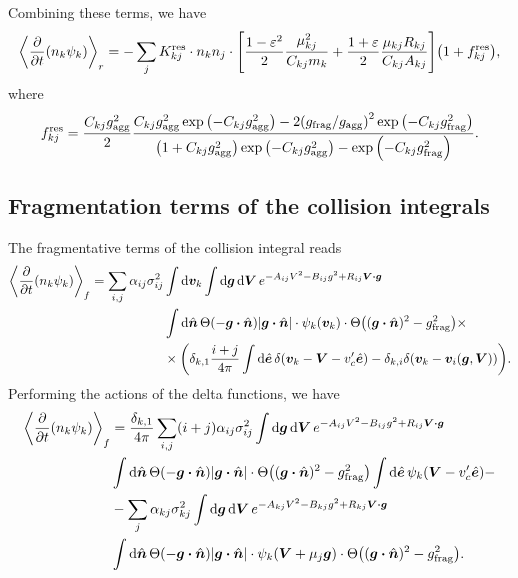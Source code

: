 \documentclass[aps,prl,preprint,groupedaddress,10pt]{revtex4-2}
\begin{document}
Combining these terms, we have
\begin{equation}
    \begin{split}
        \avg{\pdv{t}(n_k\psi_k)}_r=-\sum_{j}\utx{K}{res}_{kj}\cdot n_kn_j\cdot
        \bqty{\frac{1-\eps^2}{2}\frac{\mu_{kj}^2}{C_{kj}m_k}+\frac{1+\eps}{2}
        \frac{\mu_{kj}R_{kj}}{C_{kj}A_{kj}}}\pqty{1+\utx{f}{res}_{kj}},
    \end{split}
\end{equation}
where
\begin{equation}
    \utx{f}{res}_{kj}=\frac{C_{kj}\ltx{g}{agg}^2}{2}\frac{C_{kj}\ltx{g}{agg}^2
    \exp\pqty{-C_{kj}\ltx{g}{agg}^2}-2\pqty{\ltx{g}{frag}/\ltx{g}{agg}}^2
    \exp\pqty{-C_{kj}\ltx{g}{frag}^2}}{\pqty{1+C_{kj}\ltx{g}{agg}^2}
    \exp\pqty{-C_{kj}\ltx{g}{agg}^2}-\exp\pqty{-C_{kj}\ltx{g}{frag}^2}}.
\end{equation}
\subsection{Fragmentation terms of the collision integrals}
The fragmentative terms of the collision integral reads
\begin{equation}
    \begin{split}
        \avg{\pdv{t}(n_k\psi_k)}_f=\sum_{i,j}\alpha_{ij}\sigma_{ij}^2&\int\dd{\bv_k}\int
        \dd{\bg}\dd{\bV}e^{-A_{ij}V^2-B_{ij}g^2+R_{ij}\bV\vdot\bg}\\
        &\int\dd{\bn}\Theta\pqty{-\bg\vdot\bn}\abs{\bg\vdot\bn}\cdot\psi_k(\bv_k)\cdot
        \Theta\pqty{(\bg\vdot\bn)^2-\ltx{g}{frag}^2}\times\\
        &\times\pqty{\delta_{k,1}\frac{i+j}{4\pi}\int\dd{\be}\delta\pqty{\bv_k-\bV-v'_c\be}
            -\delta_{k,i}\delta\pqty{\bv_k-\bv_i(\bg,\bV)}}.
    \end{split}
\end{equation}
Performing the actions of the delta functions, we have
\begin{equation}
    \begin{split}
        \avg{\pdv{t}(n_k\psi_k)}_f&=\frac{\delta_{k,1}}{4\pi}\sum_{i,j}(i+j)
        \alpha_{ij}\sigma_{ij}^2\int\dd{\bg}\dd{\bV}e^{-A_{ij}V^2-B_{ij}g^2+R_{ij}\bV\vdot\bg}\\
        &\int\dd{\bn}\Theta\pqty{-\bg\vdot\bn}\abs{\bg\vdot\bn}\cdot
        \Theta\pqty{(\bg\vdot\bn)^2-\ltx{g}{frag}^2}
        \int\dd{\be}\psi_k(\bV-v'_c\be)-\\
        &-\sum_{j}\alpha_{kj}\sigma_{kj}^2\int
        \dd{\bg}\dd{\bV}e^{-A_{kj}V^2-B_{kj}g^2+R_{kj}\bV\vdot\bg}\\
        &\int\dd{\bn}\Theta\pqty{-\bg\vdot\bn}\abs{\bg\vdot\bn}\cdot\psi_k(\bV+\mu_j\bg)\cdot
        \Theta\pqty{(\bg\vdot\bn)^2-\ltx{g}{frag}^2}.
    \end{split}
\end{equation}
\end{document}
